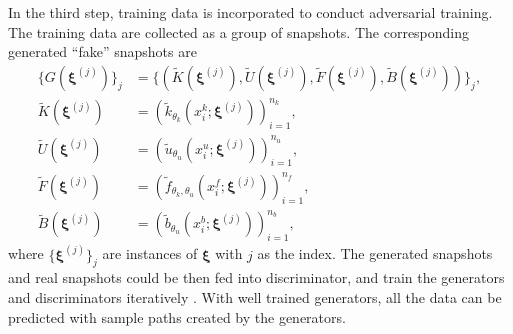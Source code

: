 \documentclass[conference,compsoc]{IEEEtran}
\begin{document}
In the third step, training data is incorporated to conduct adversarial training. The training data are collected as a group of snapshots. The corresponding generated ``fake'' snapshots are
\begin{equation} \label{eqn:G}
\begin{aligned}
\{G(\boldsymbol{\xi}^{(j)})\}_j & = \{(\tilde{K}(\boldsymbol{\xi}^{(j)}), \tilde{U}(\boldsymbol{\xi}^{(j)}),\tilde{F}(\boldsymbol{\xi}^{(j)}),\tilde{B}(\boldsymbol{\xi}^{(j)}))\}_j,\\
\tilde{K}(\boldsymbol{\xi}^{(j)}) & = (\tilde{k}_{\theta_k}(x_i^k;\boldsymbol{\xi}^{(j)}))_{i=1}^{n_k},\\
\tilde{U}(\boldsymbol{\xi}^{(j)}) & = (\tilde{u}_{\theta_u}(x_i^u;\boldsymbol{\xi}^{(j)}))_{i=1}^{n_u},\\
\tilde{F}(\boldsymbol{\xi}^{(j)}) & = (\tilde{f}_{\theta_k,\theta_u}(x_i^f;\boldsymbol{\xi}^{(j)}))_{i=1}^{n_f},\\
\tilde{B}(\boldsymbol{\xi}^{(j)}) & = (\tilde{b}_{\theta_u}(x_i^b;\boldsymbol{\xi}^{(j)}))_{i=1}^{n_b},
\end{aligned}
\end{equation}
where $\{\boldsymbol{\xi}^{(j)} \}_{j}$ are instances of $\boldsymbol{\xi}$ with $j$ as the index. The generated snapshots and real snapshots could be then fed into discriminator, and train the generators and discriminators iteratively \cite{yang2018physics}. With well trained generators, all the data can be predicted with sample paths created by the generators.
\end{document}
